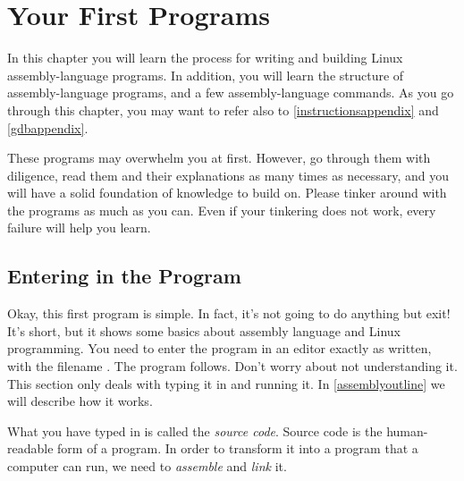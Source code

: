 \chapter{Your First Programs}
\label{firstprogs}

% 
% 
% 
% 

In this chapter you will learn the process for writing and building
Linux assembly-language programs.  In addition, you will learn the 
structure of assembly-language programs, and a few assembly-language
commands.  As you go through this chapter, you may want to refer also
to \autoref{instructionsappendix} and 
\autoref{gdbappendix}.

These programs may overwhelm you at first.  However, go through
them with diligence, read them and their explanations as many times
as necessary, and you will have a solid foundation of knowledge to
build on.  Please tinker around with the programs as much as you can.
Even if your tinkering does not work, every failure will help you learn.

\section{Entering in the Program}

Okay, this first program is simple.  In fact, it's not
going to do anything but exit!  It's short, but it shows
some basics about assembly language and Linux programming.
You need to enter the program in an editor exactly as written, 
with the filename .  The program follows.
Don't worry about not understanding it.  This section only deals with
typing it in and running it.  In \autoref{assemblyoutline} we
will describe how it works.

\begin{simpletyping}

\end{simpletyping}

What you have typed in is called the \emph{source code}.
Source code is the human-readable form of a program.  In order to
transform it into a program that a computer can run, we need to 
\emph{assemble} and \emph{link} it.

